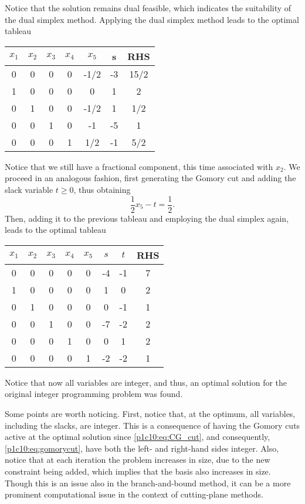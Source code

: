 Notice that the solution remains dual feasible, which indicates the suitability of the dual simplex method. Applying the dual simplex method leads to the optimal tableau 

\begin{center}
	\begin{tabular}{cccccc|c}
		 $x_1$ & $x_2$ & $x_3$ & $x_4$ & $x_5$ & s & RHS\\ \hline
		 0 & 0 & 0 &  0  & -1/2 & -3 & 15/2 \\ \hline
		 1 & 0 & 0 &  0  &  0   &  1  & 2    \\
		 0 & 1 & 0 &  0  & -1/2 &  1 & 1/2  \\
		 0 & 0 & 1 &  0  & -1   & -5 & 1    \\ 
		 0 & 0 & 0 &  1  &  1/2 & -1 & 5/2
	\end{tabular}	
\end{center}

Notice that we still have a fractional component, this time associated with $x_2$. We proceed in an analogous fashion, first generating the Gomory cut and adding the slack variable $t \ge 0$, thus obtaining 
%
\begin{equation*}
	\frac{1}{2}x_5 - t = \frac{1}{2}.
\end{equation*}
%
Then, adding it to the previous tableau and employing the dual simplex again, leads to the optimal tableau

\begin{center}
	\begin{tabular}{ccccccc|c}
	$x_1$ & $x_2$ & $x_3$ & $x_4$ & $x_5$ & $s$ & $t$ & RHS \\ \hline
	0  &  0  &  0  &  0  &  0  & -4  & -1  &  7  \\ \hline 
	1  &  0  &  0  &  0  &  0  &  1  & 0   &  2  \\ 
	0  &  1  &  0  &  0  &  0  &  0  & -1  &  1  \\
	0  &  0  &  1  &  0  &  0  & -7  & -2  &  2  \\ 
	0  &  0  &  0  &  1  &  0  &  0  &  1  &  2  \\
	0  &  0  &  0  &  0  &  1  & -2  & -2  &  1 
	\end{tabular}
\end{center}

Notice that now all variables are integer, and thus, an optimal solution for the original integer programming problem was found. 

Some points are worth noticing. First, notice that, at the optimum, all variables, including the slacks, are integer. This is a consequence of having the Gomory cuts active at the optimal solution since \eqref{p1c10:eq:CG_cut}, and consequently, \eqref{p1c10:eq:gomorycut}, have both the left- and right-hand sides integer. Also, notice that at each iteration the problem increases in size, due to the new constraint being added, which implies that the basis also increases in size. Though this is an issue also in the branch-and-bound method, it can be a more prominent computational issue in the context of cutting-plane methods. 

